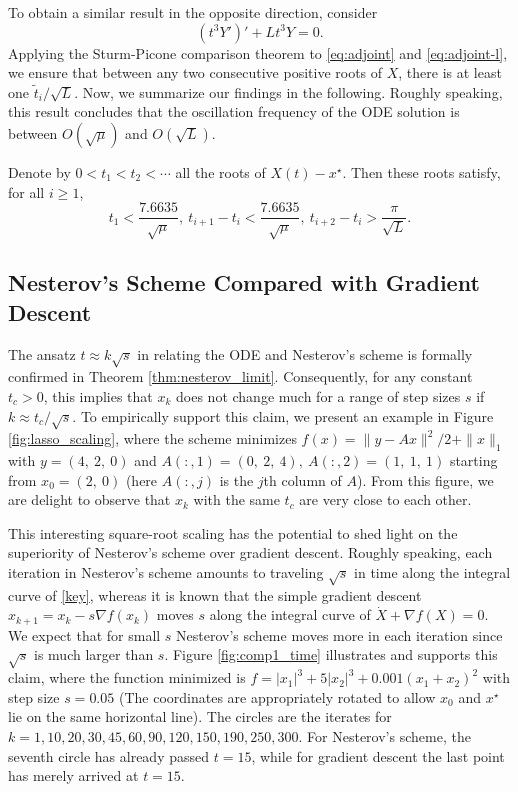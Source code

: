\documentclass[twoside,11pt]{article}
\begin{document}
To obtain a similar result in the opposite direction, consider
\begin{equation}\label{eq:adjoint-l}
(t^3Y')' + L t^3Y = 0.
\end{equation}
Applying the Sturm-Picone comparison theorem to \eqref{eq:adjoint} and \eqref{eq:adjoint-l}, we ensure that between any two consecutive positive roots of $X$, there is at least one $\tilde t_i/\sqrt{L}$. Now, we summarize our findings in the following. Roughly speaking, this result concludes that the oscillation frequency of the ODE solution is between $O(\sqrt{\mu})$ and $O(\sqrt{L})$.

\begin{theorem}
Denote by $0 < t_1 < t_2 < \cdots $ all the roots of $X(t) - x^\star$. Then these roots satisfy, for all $i \ge 1$,
\begin{equation}\nonumber
t_1 < \frac{7.6635}{\sqrt{\mu}}, ~ t_{i+1} - t_{i} < \frac{7.6635}{\sqrt{\mu}}, ~ t_{i+2} - t_i > \frac{\pi}{\sqrt{L}}.
\end{equation}
\end{theorem}

\subsection{Nesterov's Scheme Compared with Gradient Descent}
\label{sec:nest-scheme-comp}
The ansatz $t \approx k\sqrt{s}$ in relating the ODE and Nesterov's scheme is formally confirmed in Theorem \ref{thm:nesterov_limit}. Consequently, for any constant $t_c > 0$, this implies that $x_k$ does not change much for a range of step sizes $s$ if $k \approx t_c/\sqrt{s}$. To empirically support this claim, we present an example in Figure \ref{fig:lasso_scaling}, where the scheme minimizes $f(x) = \|y - Ax\|^2/2 + \|x\|_1$ with $y = (4, ~2, ~0)$ and $A(:, 1) = (0, ~2, ~4), ~ A(:, 2) = (1, ~1, ~1)$ starting from $x_0 = (2, ~0)$ (here $A(:, j)$ is the $j$th column of $A$). From this figure, we are delight to observe that $x_k$ with the same $t_c$ are very close to each other.

This interesting square-root scaling has the potential to shed light on the superiority of Nesterov's scheme over gradient descent. Roughly speaking, each iteration in Nesterov's scheme amounts to traveling $\sqrt{s}$ in time along the integral curve of \eqref{key}, whereas it is known that the simple gradient descent $x_{k+1} = x_k - s \nabla f(x_k)$ moves $s$ along the integral curve of $\dot X + \nabla f(X) = 0$. We expect that for small $s$ Nesterov's scheme moves more in each iteration since $\sqrt{s}$ is much larger than $s$. Figure \ref{fig:comp1_time} illustrates and supports this claim, where the function minimized is $f = |x_1|^3 + 5|x_2|^3 + 0.001(x_1 + x_2)^2$ with step size $s = 0.05$ (The coordinates are appropriately rotated to allow $x_0$ and $x^\star$ lie on the same horizontal line). The circles are the iterates for $k = 1, 10, 20, 30, 45, 60, 90, 120, 150, 190, 250, 300$. For Nesterov's scheme, the seventh circle has already passed $t = 15$, while for gradient descent the last point has merely arrived at $t = 15$.
\end{document}
